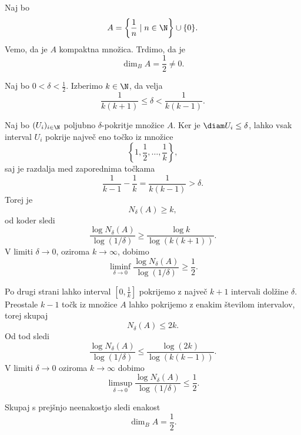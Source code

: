 \begin{zgled}
    Naj bo 
    \[
    A = \left\{ \frac{1}{n} \mid n \in \N \right\} \cup \{0\}.
    \]
    Vemo, da je \(A\) kompaktna množica. Trdimo, da je 
    \[
    \dim_B A = \frac{1}{2} \neq 0.
    \]

    Naj bo \(0 < \delta < \frac{1}{2}\). Izberimo \(k \in \N\), da velja
    \[
    \frac{1}{k(k+1)} \leq \delta < \frac{1}{k(k-1)}.
    \]

    Naj bo \((U_i)_{i \in \N}\) poljubno \(\delta\)-pokritje množice \(A\). Ker je \(\diam U_i \leq \delta\), lahko vsak interval \(U_i\) pokrije največ eno točko iz množice 
    \[
    \left\{1, \frac{1}{2}, \ldots, \frac{1}{k} \right\},
    \]
    saj je razdalja med zaporednima točkama 
    \[
    \frac{1}{k-1} - \frac{1}{k} = \frac{1}{k(k-1)} > \delta.
    \]
    Torej je 
    \[
    N_\delta(A) \geq k,
    \]
    od koder sledi
    \[
    \frac{\log N_\delta(A)}{\log (1 / \delta)} \geq \frac{\log k}{\log (k(k+1))}.
    \]
    V limiti \(\delta \to 0\), oziroma \(k \to \infty\), dobimo
    \[
    \liminf_{\delta \to 0} \frac{\log N_\delta(A)}{\log (1 / \delta)} \geq \frac{1}{2}.
    \]

    Po drugi strani lahko interval \([0, \frac{1}{k}]\) pokrijemo z največ \(k+1\) intervali dolžine \(\delta\). Preostale \(k-1\) točk iz množice \(A\) lahko pokrijemo z enakim številom intervalov, torej skupaj 
    \[
    N_\delta(A) \leq 2k.
    \]
    Od tod sledi
    \[
    \frac{\log N_\delta(A)}{\log (1 / \delta)} \leq \frac{\log (2k)}{\log (k(k-1))}.
    \]
    V limiti \(\delta \to 0\) oziroma \(k \to \infty\) dobimo
    \[
    \limsup_{\delta \to 0} \frac{\log N_\delta(A)}{\log (1 / \delta)} \leq \frac{1}{2}.
    \]

    Skupaj s prejšnjo neenakostjo sledi enakost
    \[
    \dim_B A = \frac{1}{2}.
    \]
\end{zgled}